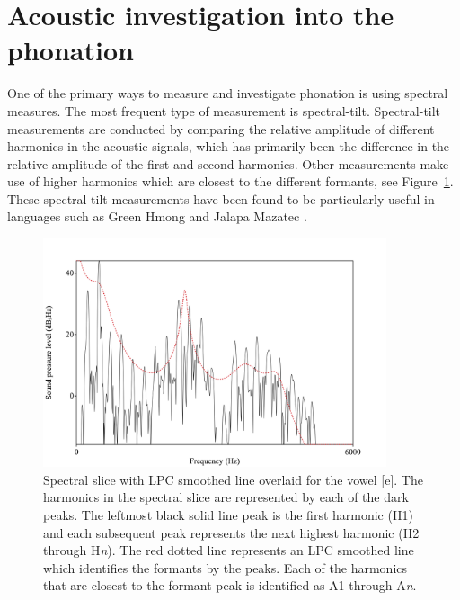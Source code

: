 \documentclass[12pt, letterpaper]{article}
\begin{document}
\section{Acoustic investigation into the phonation} \label{sec:Acoustics}

One of the primary ways to measure and investigate phonation is using spectral measures. The most frequent type of measurement is spectral-tilt. Spectral-tilt measurements are conducted by comparing the relative amplitude of different harmonics in the acoustic signals, which has primarily been the difference in the relative amplitude of the first and second harmonics. Other measurements make use of higher harmonics which are closest to the different formants, see Figure~\ref{fig:Harmonics}. These spectral-tilt measurements have been found to be particularly useful in languages such as Green Hmong \citep{huffmanMeasuresPhonationType1987,andruskiPhonationTypesProduction2000} and Jalapa Mazatec \citep{silvermanPhoneticStructuresJalapa1995,blankenshipTimeCourseBreathiness1997}.

\begin{figure}[!h]
	\centering
	\includegraphics[width=0.9\textwidth]{../Harmonics.png}
	\caption{Spectral slice with LPC smoothed line overlaid for the vowel [e]. The harmonics in the spectral slice are represented by each of the dark peaks. The leftmost black solid line peak is the first harmonic (H1) and each subsequent peak represents the next highest harmonic (H2 through H\textit{n}). The red dotted line represents an LPC smoothed line which identifies the formants by the peaks. Each of the harmonics that are closest to the formant peak is identified as A1 through A\textit{n}.}
	\label{fig:Harmonics}
\end{figure}
\end{document}
